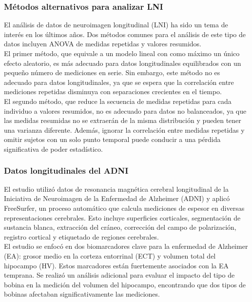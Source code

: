 	
	\subsubsection{Métodos alternativos para analizar LNI}
	
	El análisis de datos de neuroimagen longitudinal (LNI) ha sido un tema de interés en los últimos años. Dos métodos comunes para el análisis de este tipo de datos incluyen ANOVA de medidas repetidas y valores resumidos.\\ 
	
	El primer método, que equivale a un modelo lineal con como máximo un único efecto aleatorio, es más adecuado para datos longitudinales equilibrados con un pequeño número de mediciones en serie. Sin embargo, este método no es adecuado para datos longitudinales, ya que se espera que la correlación entre mediciones repetidas disminuya con separaciones crecientes en el tiempo.\\
	
	El segundo método, que reduce la secuencia de medidas repetidas para cada individuo a valores resumidos, no es adecuado para datos no balanceados, ya que las medidas resumidas no se extraerán de la misma distribución y pueden tener una varianza diferente. Además, ignorar la correlación entre medidas repetidas y omitir sujetos con un solo punto temporal puede conducir a una pérdida significativa de poder estadístico.
	
	
	\subsubsection{Datos longitudinales del ADNI}
	
	El estudio utilizó datos de resonancia magnética cerebral longitudinal de la Iniciativa de Neuroimagen de la Enfermedad de Alzheimer (ADNI) y aplicó FreeSurfer, un proceso automático que calcula mediciones de espesor en diversas representaciones cerebrales. Esto incluye superficies corticales, segmentación de sustancia blanca, extracción del cráneo, corrección del campo de polarización, registro cortical y etiquetado de regiones cerebrales.\\
	
	El estudio se enfocó en dos biomarcadores clave para la enfermedad de Alzheimer (EA): grosor medio en la corteza entorrinal (ECT) y volumen total del hipocampo (HV). Estos marcadores están fuertemente asociados con la EA temprana. Se realizó un análisis adicional para evaluar el impacto del tipo de bobina en la medición del volumen del hipocampo, encontrando que dos tipos de bobinas afectaban significativamente las mediciones.\\
	
